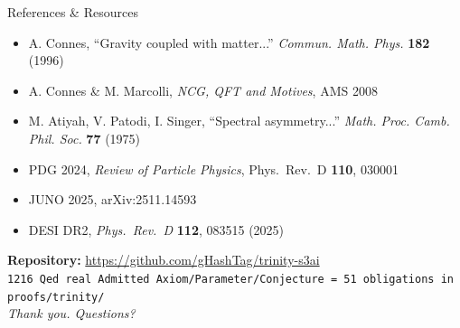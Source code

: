 \documentclass[aspectratio=169,11pt]{beamer}
\begin{document}
\begin{frame}{References \& Resources}
  \begin{itemize}
    \item A. Connes, ``Gravity coupled with matter...'' \textit{Commun. Math. Phys.} \textbf{182} (1996)
    \item A. Connes \& M. Marcolli, \textit{NCG, QFT and Motives}, AMS 2008
    \item M. Atiyah, V. Patodi, I. Singer, ``Spectral asymmetry...'' \textit{Math. Proc. Camb. Phil. Soc.} \textbf{77} (1975)
    \item PDG 2024, \textit{Review of Particle Physics}, Phys.\ Rev.\ D \textbf{110}, 030001
    \item JUNO 2025, arXiv:2511.14593
    \item DESI DR2, \textit{Phys.\ Rev.\ D} \textbf{112}, 083515 (2025)
  \end{itemize}
  \vfill
  \begin{center}
    \textbf{Repository:} \url{https://github.com/gHashTag/trinity-s3ai}\\[0.5em]
    \texttt{1216 Qed  real Admitted  Axiom/Parameter/Conjecture = 51 obligations in proofs/trinity/}\\[0.5em]
    \textit{Thank you. Questions?}
  \end{center}
\end{frame}
\end{document}
